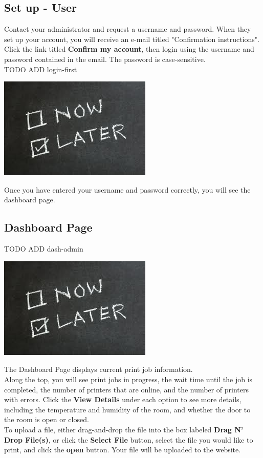   \subsection{Set up - User}
      Contact your administrator and request a username and password. When they set up your account,
      you will receive an e-mail titled "Confirmation instructions".  Click the link titled \textbf{Confirm
      my account}, then login using the username and password contained in the email.  The password is case-sensitive.\\
TODO ADD login-first
      \begin{center}
      \includegraphics[scale=1]{images/Now-Later.png}
    \end{center}
      Once you have entered your username and password correctly, you will see the dashboard page.

\newpage
  \subsection{Dashboard Page}
TODO ADD dash-admin
      \begin{center}
      \includegraphics[scale=1]{images/Now-Later.png}
    \end{center}
      The Dashboard Page displays current print job information.\\
      Along the top, you will see print jobs in progress, the wait time until the job is completed, the number
      of printers that are online, and the number of printers with errors.  Click the \textbf{View Details} under
      each option to see more details, including the temperature and humidity of the room, and whether the door
      to the room is open or closed.\\
      To upload a file, either drag-and-drop the file into the box labeled \textbf{Drag N' Drop File(s)}, or
      click the \textbf{Select File} button, select the file you would like
      to print, and click the \textbf{open} button.  Your file will be uploaded to the website.


